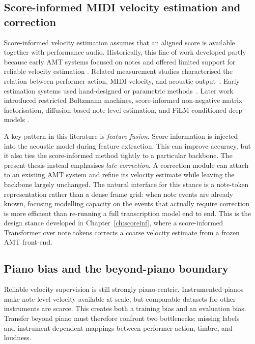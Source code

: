 \subsection{Score-informed MIDI velocity estimation and correction}
\label{sec:bg:velocity:scoreinf}

Score-informed velocity estimation assumes that an aligned score is available together with performance audio. Historically, this line of work developed partly because early AMT systems focused on notes and offered limited support for reliable velocity estimation \cite{amt2013ov}. Related measurement studies characterised the relation between performer action, MIDI velocity, and acoustic output~\cite{dan2006psy,goebl2003role}. Early estimation systems used hand-designed or parametric methods~\cite{szeto2005finding,ewert2011est}. Later work introduced restricted Boltzmann machines, score-informed non-negative matrix factorisation, diffusion-based note-level estimation, and FiLM-conditioned deep models \cite{van2014pred,jeong2017note,jeong2018timbre,kim2023diffvel,kim2023score,kim2024method,simonetta2022acoustics}.

A key pattern in this literature is \emph{feature fusion}. Score information is injected into the acoustic model during feature extraction. This can improve accuracy, but it also ties the score-informed method tightly to a particular backbone. The present thesis instead emphasises \emph{late correction}. A correction module can attach to an existing AMT system and refine its velocity estimate while leaving the backbone largely unchanged. The natural interface for this stance is a note-token representation rather than a dense frame grid: when note events are already known, focusing modelling capacity on the events that actually require correction is more efficient than re-running a full transcription model end to end. This is the design stance developed in Chapter~\ref{ch:scoreinf}, where a score-informed Transformer over note tokens corrects a coarse velocity estimate from a frozen AMT front-end.

\subsection{Piano bias and the beyond-piano boundary}
\label{sec:bg:velocity:beyond}

Reliable velocity supervision is still strongly piano-centric. Instrumented pianos make note-level velocity available at scale, but comparable datasets for other instruments are scarce. This creates both a training bias and an evaluation bias. Transfer beyond piano must therefore confront two bottlenecks: missing labels and instrument-dependent mappings between performer action, timbre, and loudness.

